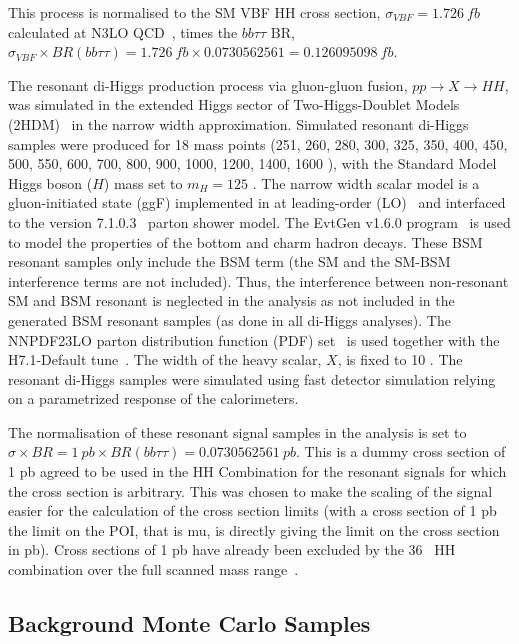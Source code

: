  This process is normalised to the SM VBF HH cross section, $\sigma_{VBF}=\SI{1.726}{fb}$ calculated at N3LO QCD~\cite{Dreyer_2018}, times the $bb\tau\tau$ BR, $\sigma_{VBF} \times BR (bb \tau\tau)  = \SI{1.726}{fb} \times 0.0730562561  =  \SI{0.126095098}{fb}$.  
 
 The resonant di-Higgs production process via gluon-gluon fusion, $pp \rightarrow X \rightarrow HH$, was
 simulated in the extended Higgs sector of Two-Higgs-Doublet Models
 (2HDM)~\cite{Branco:2011iw} in the narrow width approximation. Simulated
 resonant di-Higgs samples were produced for 18 mass points (251, 260, 280, 300, 325, 350, 400, 450, 500, 550, 600, 700, 800,
 900, 1000, 1200, 1400, 1600 \GeV), with the Standard Model Higgs boson ($H$) mass set to $m_H=125$
 \GeV. The narrow width scalar model is a gluon-initiated state (ggF) implemented in
 \MADGRAPH at leading-order (LO)~\cite{mg5_lo} and interfaced to the  version 7.1.0.3~\cite{Herwigpp}
 parton shower model. The EvtGen v1.6.0 program~\cite{EvtGen} is used to model the properties of the bottom and charm hadron decays. 
 These BSM resonant samples only include the BSM term (the SM and the SM-BSM interference terms are not included). Thus, the interference between non-resonant SM and BSM resonant is neglected in the analysis as not included in the generated BSM resonant samples (as done in all di-Higgs analyses). The NNPDF23LO parton distribution function (PDF)
 set~\cite{NNPDF23PDFSet} is used together with the H7.1-Default
 tune~\cite{Gieseke:2012ft}. The width of the heavy scalar, $X$, is fixed to 10
 \MeV . The resonant di-Higgs samples were simulated using fast detector
 simulation relying on a parametrized response of the calorimeters.
 
 The normalisation of these resonant signal samples in the analysis is set to $\sigma \times BR  = \SI{1}{pb} \times BR (bb \tau \tau)  =  0.073056256 \SI{1}{pb}$. This is a dummy cross section of 1 pb agreed to be used in the HH Combination for the resonant signals for which the cross section is arbitrary. This was chosen to make the scaling of the signal easier for the calculation of the cross section limits (with a cross section of 1 pb the limit on the POI, that is mu, is directly giving the limit on the cross section in pb). Cross sections of 1 pb have already been excluded by the 36 \ifb\ HH combination over the full scanned mass range~\cite{HDBS-2018-58}.
 
 
 


 \subsection{Background Monte Carlo Samples}

